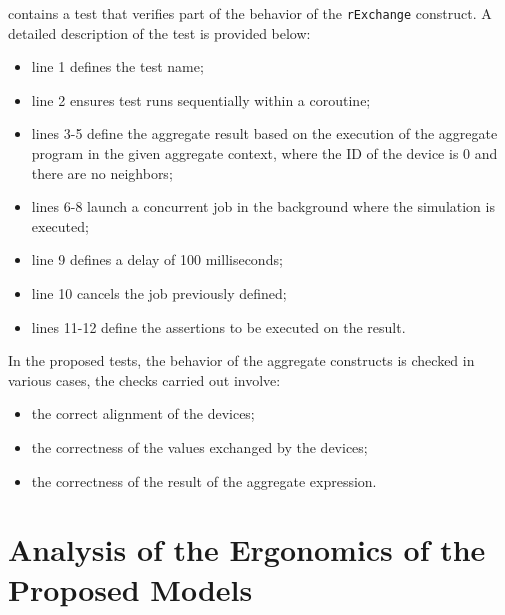 contains a test that verifies part of the behavior of the \texttt{rExchange} construct. A detailed description of the test is provided below:

\begin{itemize}
    \item line 1 defines the test name;
    \item line 2 ensures test runs sequentially within a coroutine;
    \item lines 3-5 define the aggregate result based on the execution of the aggregate program in the given aggregate context, where the ID of the device is 0 and there are no neighbors;
    \item lines 6-8 launch a concurrent job in the background where the simulation is executed;
    \item line 9 defines a delay of 100 milliseconds;
    \item line 10 cancels the job previously defined;
    \item lines 11-12 define the assertions to be executed on the result.
\end{itemize}



In the proposed tests, the behavior of the aggregate constructs is checked in various cases, the checks carried out involve:

\begin{itemize}
    \item the correct alignment of the devices;
    \item the correctness of the values exchanged by the devices;
    \item the correctness of the result of the aggregate expression.
\end{itemize}

\section{Analysis of the Ergonomics of the Proposed Models}
\label{section:analysis-ergonomics-proposed-models}

